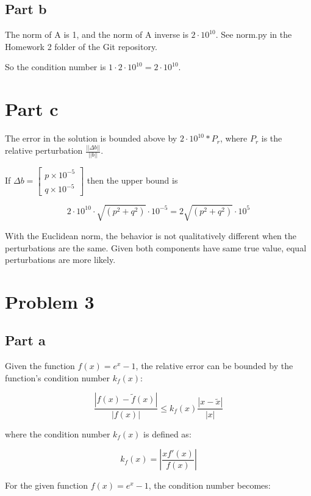 \documentclass[12pt]{article}
\begin{document}
\subsection*{Part b}

The norm of A is 1, and the norm of A inverse is $2 \cdot 10^10$. See norm.py in the Homework 2 folder of the Git repository.

So the condition number is $1 \cdot 2 \cdot 10^{10} = 2 \cdot 10^{10}$.

\section*{Part c}

The error in the solution is bounded above by $2 \cdot 10^{10} * P_r$, where $P_r$ is the relative perturbation $\frac{||\Delta b||}{||b||}$. 


If $ \Delta b = \begin{bmatrix} p \times 10^{-5} \\ q \times 10^{-5} \end{bmatrix} $ then the upper bound is 

$$2 \cdot 10^{10} \cdot \sqrt{(p^2 + q^2)} \cdot 10^{-5} = 2\sqrt{(p^2 + q^2)} \cdot 10^5$$

With the Euclidean norm, the behavior is not qualitatively different when the perturbations are the same. Given both components have same true value, equal perturbations are more likely.

\newpage

\section*{Problem 3}

\subsection*{Part a}

Given the function \( f(x) = e^x - 1 \), the relative error can be bounded by the function's condition number \( k_f(x) \):

\[
\frac{|f(x) - \tilde{f}(x)|}{|f(x)|} \leq k_{f}(x) \frac{|x - \tilde{x}|}{|x|}
\]

where the condition number \( k_f(x) \) is defined as:

\[
k_{f}(x) = \left| \frac{x f'(x)}{f(x)} \right|
\]

For the given function \( f(x) = e^x - 1 \), the condition number becomes:
\end{document}
